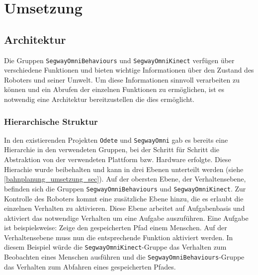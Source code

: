 
\section{Umsetzung}
\label{umsetzung_integration_sec}

\subsection{Architektur}
\label{integration_architektur_sec}

Die Gruppen \lstinline{SegwayOmniBehaviours} und \lstinline{SegwayOmniKinect} verfügen über 
verschiedene Funktionen und bieten wichtige Informationen über den Zustand des Roboters und 
seiner Umwelt. Um diese Informationen sinnvoll verarbeiten zu können und ein Abrufen der einzelnen 
Funktionen zu ermöglichen, ist es notwendig eine Architektur bereitzustellen die dies ermöglicht.

\subsubsection{Hierarchische Struktur}
\label{integration_umsetzung_hierarchie_sec}

In den existierenden Projekten \lstinline{Odete} und \lstinline{SegwayOmni} gab es bereits eine Hierarchie 
in den verwendeten Gruppen, bei der Schritt für Schritt die Abstraktion von der verwendeten 
Plattform bzw. Hardware erfolgte. Diese Hierachie wurde beibehalten und kann in drei Ebenen unterteilt 
werden (siehe \ref{bahnplanung_umsetzung_sec}). Auf der obersten Ebene, der Verhaltensebene, befinden sich die 
Gruppen \lstinline{SegwayOmniBehaviours} und \lstinline{SegwayOmniKinect}. Zur Kontrolle des Roboters kommt 
eine zusätzliche Ebene hinzu, die es erlaubt die einzelnen Verhalten zu aktivieren. Diese Ebene arbeitet auf 
Aufgabenbasis und aktiviert das notwendige Verhalten um eine Aufgabe auszuführen. Eine Aufgabe ist 
beispielsweise: Zeige den gespeicherten Pfad einem Menschen. Auf der Verhaltensebene muss nun die entsprechende 
Funktion aktiviert werden. In diesem Beispiel würde die \lstinline{SegwayOmniKinect}-Gruppe das Verhalten zum 
Beobachten eines Menschen ausführen und die \lstinline{SegwayOmniBehaviours}-Gruppe das Verhalten zum Abfahren 
eines gespeicherten Pfades.

